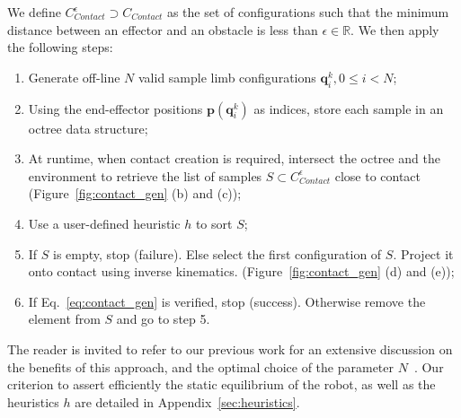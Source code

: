 
We define $C_{Contact}^{\epsilon} \supset C_{Contact}$ as the set of configurations such that the minimum distance 
between an effector and an obstacle is less than $\epsilon \in \mathbb{R}$.
We then apply the following steps:
\begin{enumerate}
\item Generate off-line $N$ valid sample limb configurations $\mathbf{q}^k_i,  0 \leq i < N$;
\item Using the end-effector positions $\mathbf{p}(\mathbf{q}^k_i)$ as indices, store each sample in an octree data structure;
\item At runtime, when contact creation is required, intersect the octree and the environment to retrieve the list of samples $S \subset C_{Contact}^{\epsilon}$ close to contact (Figure~\ref{fig:contact_gen} (b) and (c));
\item Use a user-defined heuristic $h$ to sort $S$;
\item If $S$ is empty, stop (failure). Else select the first configuration of $S$. Project it onto contact using inverse kinematics. (Figure~\ref{fig:contact_gen} (d) and (e));
\item If Eq.~\ref{eq:contact_gen} is verified, stop (success). Otherwise remove the element from $S$ and go to step 5.
\end{enumerate}

The reader is invited to refer to our previous work for an extensive discussion on the benefits of this approach, and the optimal choice 
of the parameter $N$~\citep{Tonneau2014}. Our criterion to assert efficiently the static equilibrium of the robot, as well as the heuristics $h$ are detailed in Appendix~\ref{sec:heuristics}.

